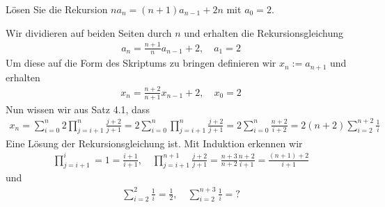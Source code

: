 
\begin{exercise}

	Lösen Sie die Rekursion $n a_n = (n + 1) a_{n - 1} + 2n$ mit $a_0 = 2$. 

\end{exercise}


\begin{solution}

	Wir dividieren auf beiden Seiten durch $n$ und erhalten die Rekursionsgleichung 
	\begin{align*}
	a_n = \frac{n + 1}{n} a_{n - 1} + 2, \quad a_1 = 2
	\end{align*}
	Um diese auf die Form des Skriptums zu bringen definieren wir $x_n := a_{n + 1}$ und erhalten 
	\begin{align*}
	x_n = \frac{n + 2}{n + 1} x_{n -1} + 2, \quad x_0 = 2
	\end{align*}
	Nun wissen wir aus Satz 4.1, dass 
	\begin{align*}
	x_n = \sum_{i = 0}^n 2 \prod_{j =  i + 1}^n \frac{j + 2}{j + 1}  = 2 \sum_{i = 0}^n \prod_{j =  i + 1}^n \frac{j + 2}{j + 1} = 2 \sum_{i = 0}^n \frac{n + 2}{i + 2} = 2 (n + 2) \sum_{i=2}^{n+2} \frac{1}{i} 
	\end{align*}
	Eine Lösung der Rekursionsgleichung ist. Mit Induktion erkennen wir
	\begin{align*}
	\prod_{j=i+1}^i = 1 = \frac{i + 1}{i +1}, \quad \prod_{j = i+1}^{n + 1} \frac{j + 2}{j + 1} = \frac{n + 3}{n + 2} \frac{n + 2}{i + 1} = \frac{(n + 1) + 2}{i + 1}
	\end{align*}
	und 
	\begin{align*}
	\sum_{i = 2}^2 \frac{1}{i} = \frac{1}{2}, \quad \sum_{i = 2}^{n + 3} \frac{1}{i} = ?
	\end{align*}
\end{solution}

